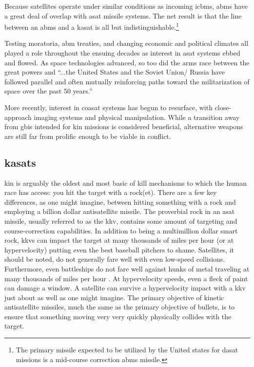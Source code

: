 Because satellites operate under similar conditions as incoming
\acp{icbm}, \acs{abms} have a great deal of overlap with \ac{asat}
missile systems.  The net result is that the line between an \ac{abms}
and a \ac{kasat} is all but indistinguishable.\footnote{The primary
missile expected to be utilized by the United states for \ac{dasat}
missions is a mid-course correction \ac{abms}
missile.\cite[p01-15]{brian}}

Testing moratoria\cite{xxx}, \ac{abm} treaties\cite{xxx}, and changing
economic\cite[boom]{xxx} and political\cite[fall of ussr]{xxx}
climates all played a role throughout the ensuing decades as interest
in \ac{asat} systems ebbed and flowed.\cite[xxx]{grego} As space
technologies advanced, so too did the arms race between the great
powers and ``...the United States and the Soviet Union/ Russia have
followed parallel and often mutually reinforcing paths toward the
militarization of space over the past 50 years.''\cite[p2]{grego}

More recently, interest in \ac{coasat} systems has begun to resurface,
with close-approach imaging systems \cite[the russian one maybe?]{xxx}
and physical manipulation.\cite[chinese one maybe?]{xxx} While a
transition away from \acp{gbi} intended for \ac{kin} missions is
considered beneficial, alternative weapons are still far from prolific
enough to be viable in conflict.

\subsection{\acfp{kasat}}

\acl{kin} is arguably the oldest and most basic of kill mechanisms to
which the human race has access: you hit the target with a
rock(et). There are a few key differences, as one might imagine,
between hitting something with a rock and employing a billion dollar
antisatellite missile.  The proverbial rock in an \ac{asat} missile,
usually referred to as the \acf{kkv}, contains some amount of
targeting and course-correction capabilities.\cite{sm3} In addition to
being a multimillion dollar smart rock, \acp{kkv} can impact the
target at many thousands of miles per hour (or at hypervelocity)
putting even the best baseball pitchers to shame.\cite[kkv impact
  simulation]{xxx} Satellites, it should be noted, do not generally
fare well with even low-speed collisions.\cite{whoopsies} Furthermore,
even battleships do not fare well against hunks of metal traveling at
many thousands of miles per hour \cite[any hypersonic paper]{xxx}.  At
hypervelocity speeds, even a fleck of paint can damage a
window.\cite[iss window]{xxx} A satellite can survive a hypervelocity
impact with a \ac{kkv} just about as well as one might
imagine.\cite[hypervelocity impact simulation]{xxx} The primary
objective of kinetic antisatellite missiles, much the same as the
primary objective of bullets, is to ensure that something moving very
very quickly physically collides with the target.\cite[needed?]{xxx}

